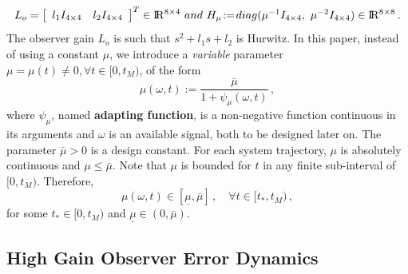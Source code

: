 \documentclass[letterpaper, 10 pt, journal, twocolumn]{IEEEtran}  %
\def\re{{\rm I}\! {\rm R}}
\theoremstyle{plain}
\theoremstyle{definition}
\theoremstyle{remark}
\newtheorem*{remark}{Remark}
\begin{document}
%
\begin{equation}
L_o=\left[\begin{array}{cc}  l_1 I_{4 \times 4} & l_2 I_{4 \times 4} \end{array} \right]^T \in \re^{8 \times 4} \ \mbox{and} \
H_\mu\!:=\!\mbox{diag}(\mu^{-1}  I_{4 \times 4}, \ \mu^{-2} I_{4 \times 4}) \in \re^{8 \times 8}\,.
\label{eq:defLhgo_and_Hhgo}
\end{equation}
%
%
%
The observer gain $L_o$ is such that $s^{2}+l_1
s+ l_2$ is Hurwitz. In this paper,
instead of using a constant $\mu$, we introduce a {\em variable}
parameter $\mu=\mu(t)\neq\!0, \forall t\in[0,t_M)$, %
of the form
%
\begin{equation}
\mu(\omega,t):=\frac{\bar{\mu}}{1+
\psi_\mu(\omega,t)}\,,\label{eq:def_mu}
\end{equation}
%
where $\psi_\mu$, named \textbf{adapting function}, is a
non-negative function continuous in its
arguments and $\omega$ is an available signal, both to be designed later on. The parameter $\bar{\mu}\!>\!0$ is a design constant. For each
system trajectory, $\mu$ is absolutely continuous and
$\mu\!\leq\!\bar{\mu}$. Note that $\mu$ is bounded for $t$ in any
finite sub-interval of $[0,t_M)$. Therefore,
%
\begin{equation}
\mu(\omega,t)\in[\underline{\mu},\bar{\mu}]\,, \quad \forall
t\!\in\![t_*,t_M)\,, \label{eq:P3}
\end{equation}
%
for some $t_* \in [0,t_M)$ and
$\underline{\mu}\!\in\!(0,\bar{\mu})$. 



\subsection{High Gain Observer Error Dynamics}
\end{document}
